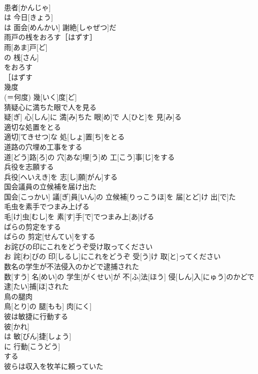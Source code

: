 \documentclass[8pt]{extreport}
\begin{document}
\begin{CJK}{UTF8}{min}
\\	患者[かんじゃ]
\\	は 今日[きょう]
\\	は 面会[めんかい] 謝絶[しゃぜつ]だ
\\	雨戸の桟をおろす［はずす］	
\\	雨[あま]戸[ど]
\\	の 桟[さん]
\\	をおろす 
\\	［はずす 
\\	幾度	
\\	(＝何度)	幾[いく]度[ど]
\\	猜疑心に満ちた眼で人を見る	
\\	[｟文語｠ 
\\	猜[さい]疑[ぎ] 心[しん]に 満[み]ちた 眼[め]で 人[ひと]を 見[み]る
\\	適切な処置をとる	
\\	適切[てきせつ]な 処[しょ]置[ち]をとる
\\	道路の穴埋め工事をする	
\\	道[どう]路[ろ]の 穴[あな]埋[う]め 工[こう]事[じ]をする
\\	兵役を志願する	
\\	兵役[へいえき]を 志[し]願[がん]する
\\	国会議員の立候補を届け出た	
\\	国会[こっかい] 議[ぎ]員[いん]の 立候補[りっこうほ]を 届[とど]け 出[で]た
\\	毛虫を素手でつまみ上げる	
\\	毛[け]虫[むし]を 素[す]手[で]でつまみ上[あ]げる
\\	ばらの剪定をする	
\\	ばらの 剪定[せんてい]をする
\\	お詫びの印にこれをどうぞ受け取ってください	
\\	お 詫[わ]びの 印[しるし]にこれをどうぞ 受[う]け 取[と]ってください
\\	数名の学生が不法侵入のかどで逮捕された	
\\	数[すう] 名[めい]の 学生[がくせい]が 不[ふ]法[ほう] 侵[しん]入[にゅう]のかどで 逮[たい]捕[ほ]された
\\	鳥の腿肉	
\\	鳥[とり]の 腿[もも] 肉[にく]
\\	彼は敏捷に行動する	
\\	彼[かれ]
\\	は 敏[びん]捷[しょう]
\\	に 行動[こうどう]
\\	する 
\\	彼らは収入を牧羊に頼っていた	

\end{CJK}
\end{document}
